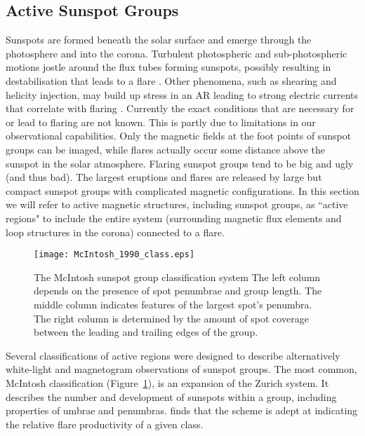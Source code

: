 \subsection{Active Sunspot Groups}\label{intro:flareactreg}

Sunspots are formed beneath the solar surface and emerge through the photosphere and into the corona. Turbulent photospheric and sub-photospheric motions jostle around the flux tubes forming sunspots, possibly resulting in destabilisation that leads to a flare \citep{Conlon:2010a}. Other phenomena, such as shearing and helicity injection, may build up stress in an AR leading to strong electric currents that correlate with flaring \citep{Schrijver:2005,Schrijver:2007}. 
Currently the exact conditions that are necessary for or lead to flaring are not known. This is partly due to limitations in our observational capabilities. Only the magnetic fields at the foot points of sunspot groups can be imaged, while flares actually occur some distance above the sunspot in the solar atmosphere. Flaring sunspot groups tend to be big and ugly (and thus bad). The largest eruptions and flares are released by large but compact sunspot groups with complicated magnetic configurations. In this section we will refer to active magnetic structures, including sunspot groups, as ``active regions" to include the entire system (surrounding magnetic flux elements and loop structures in the corona) connected to a flare.

\begin{figure}[!t]
\centerline{\texttt{[image: McIntosh\_1990\_class.eps]}}
\caption[The McIntosh sunspot group classification system.]{The McIntosh sunspot group classification system \citep[from][]{McIntosh:1990} The left column depends on the presence of spot penumbrae and group length. The middle column indicates features of the largest spot's penumbra. The right column is determined by the amount of spot coverage between the leading and trailing edges of the group.}
\label{fig:mcintoshclass}
\end{figure}

Several classifications of active regions were designed to describe alternatively white-light and magnetogram observations of sunspot groups. The most common, McIntosh classification (Figure~\ref{fig:mcintoshclass}), is an expansion of the Zurich system. It describes the number and development of sunspots within a group, including properties of umbrae and \glspl{penumbra}. \cite{McIntosh:1990} finds that the scheme is adept at indicating the relative flare productivity of a given class. 

